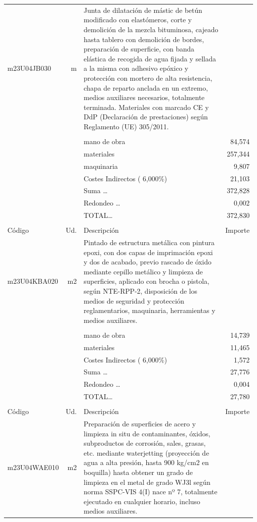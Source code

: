 \begin{supertabular}{l r p{60mm} r}
\hline%
m23U04JB030&m&Junta de dilatación de mástic de betún modificado con elastómeros, corte y demolición de la mezcla bituminosa, cajeado hasta tablero con demolición de bordes, preparación de superficie, con banda elástica de recogida de agua fijada y sellada a la misma con adhesivo epóxico y protección con mortero de alta resistencia, chapa de reparto anclada en un extremo, medios auxiliares necesarios, totalmente terminada. Materiales con marcado CE y DdP (Declaración de prestaciones) según Reglamento (UE) 305/2011.&\\%
&&&\\%
&&mano de obra&    84,574\\%
&&materiales&   257,344\\%
&&maquinaria&     9,807\\%
&&Costes Indirectos (     6,000\%)&    21,103\\%
&&Suma \ldots&   372,828\\%
&&Redondeo \ldots&     0,002\\%
%
&&TOTAL\ldots&   372,830\\%
&&&\\%
Código&Ud.&Descripción&Importe\\%
\hline%
m23U04KBA020&m2&Pintado de estructura metálica con pintura epoxi, con dos capas de imprimación epoxi y dos de acabado, previo rascado de óxido mediante cepillo metálico y limpieza de superficies, aplicado con brocha o pistola, según NTE{-}RPP{-}2, disposición de los medios de seguridad y protección reglamentarios, maquinaria, herramientas y medios auxiliares.&\\%
&&&\\%
&&mano de obra&    14,739\\%
&&materiales&    11,465\\%
&&Costes Indirectos (     6,000\%)&     1,572\\%
&&Suma \ldots&    27,776\\%
&&Redondeo \ldots&     0,004\\%
%
&&TOTAL\ldots&    27,780\\%
&&&\\%
Código&Ud.&Descripción&Importe\\%
\hline%
m23U04WAE010&m2&Preparación de superficies de acero y limpieza in situ de contaminantes, óxidos, subproductos de corrosión, sales, grasas, etc. mediante waterjetting (proyección de agua a alta presión, hasta 900 kg/cm2 en boquilla) hasta obtener un grado de limpieza en el metal de grado WJ3l según norma SSPC{-}VIS 4(I) nace nº 7, totalmente ejecutado en cualquier horario, incluso medios auxiliares.&\\%

\end{supertabular}
